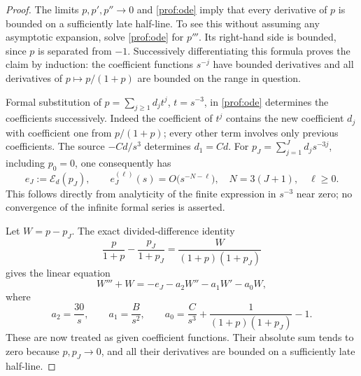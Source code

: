 \begin{proof}
The limits $p,p',p''\to0$ and \eqref{prof:ode} imply that every derivative
of $p$ is bounded on a sufficiently late half-line.  To see this without
assuming any asymptotic expansion, solve \eqref{prof:ode} for $p'''$.
Its right-hand side is bounded, since $p$ is separated from $-1$.
Successively differentiating this formula proves the claim by induction:
the coefficient functions $s^{-j}$ have bounded derivatives and all
derivatives of $p\mapsto p/(1+p)$ are bounded on the range in question.

Formal substitution of $p=\sum_{j\ge1}d_jt^j$, $t=s^{-3}$, in
\eqref{prof:ode} determines the coefficients successively.  Indeed the
coefficient of $t^j$ contains the new coefficient $d_j$ with coefficient
one from $p/(1+p)$; every other term involves only previous coefficients.
The source $-Cd/s^3$ determines $d_1=Cd$.  For
$p_J=\sum_{j=1}^Jd_js^{-3j}$, including $p_0=0$, one consequently has
\begin{equation}\label{prof:formal-residual}
 e_J:=\mathcal E_d(p_J),\qquad
 e_J^{(\ell)}(s)=O\bigl(s^{-N-\ell}\bigr),
 \quad N=3(J+1),\quad \ell\ge0.
\end{equation}
This follows directly from analyticity of the finite expression in
$s^{-3}$ near zero; no convergence of the infinite formal series is asserted.

Let $W=p-p_J$.  The exact divided-difference identity
\[
 \frac p{1+p}-\frac{p_J}{1+p_J}
 =\frac{W}{(1+p)(1+p_J)}
\]
gives the linear equation
\begin{equation}\label{prof:remainder-equation}
 W'''+W=-e_J-a_2W''-a_1W'-a_0W,
\end{equation}
where
\[
 a_2=\frac{30}{s},\qquad a_1=\frac B{s^2},\qquad
 a_0=\frac C{s^3}+\frac1{(1+p)(1+p_J)}-1.
\]
These are now treated as given coefficient functions.  Their absolute
sum tends to zero because $p,p_J\to0$, and all their derivatives are
bounded on a sufficiently late half-line.


\end{proof}
